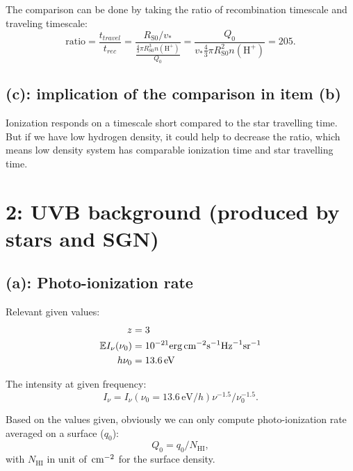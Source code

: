 \documentclass[12pt,letterpaper]{article}
\newcommand{\cm}{\textrm{\,cm}}
\newcommand{\sradius}{R_{\textrm{S0}}}
\newcommand{\hdensity}{n(\textrm{H}^{+})}
\newcommand{\second}{\textrm{s}}
\newcommand{\erg}{\textrm{erg}}
\newcommand{\sr}{\textrm{sr}}
\newcommand{\hz}{\textrm{Hz}}
\newcommand{\nhi}{N_{\textrm{HI}}}
\newcommand{\mean}{\mathbb{E}}
\begin{document}
The comparison can be done by taking the ratio of recombination timescale and traveling timescale:
\begin{equation}
    \textrm{ratio} 
    = \frac{t_{travel}}{t_{rec}} 
    = \frac{ 
        \sradius / v_{*}
     }{
        \frac{\frac{4}{3} \pi \sradius^3 \hdensity}{Q_0}
     }
    = \frac{
        Q_0
    }{
        v_{*} {\frac{4}{3} \pi \sradius^2 \hdensity}
    }
    = 205.
\end{equation}

\subsection*{(c): implication of the comparison in item (b)}

Ionization responds on a timescale short compared to the star travelling time.
But if we have low hydrogen density, it could help to decrease the ratio, which means low density system has comparable ionization time and star travelling time. 

\section*{2: UVB background (produced by stars and SGN)}

\subsection*{(a): Photo-ionization rate}

Relevant given values:
\begin{equation}
    \begin{split}
        z &= 3\\
        \mean I_\nu(\nu_0) &= 10^{-21} \erg \cm^{-2} \second^{-1} \hz^{-1} \sr^{-1} \\
        h \nu_0 &= 13.6 \, \textrm{eV}
    \end{split}
\end{equation}

The intensity at given frequency:
\begin{equation}
    I_\nu = I_\nu(\nu_0 = 13.6 \, \textrm{eV}/ h) \nu^{-1.5}/\nu_0^{-1.5}.
\end{equation}

Based on the values given, obviously we can only compute photo-ionization rate averaged on a surface ($q_0$):
\begin{equation*}
    Q_0 = q_0 / \nhi,
\end{equation*}
with $\nhi$ in unit of $\cm^{-2}$ for the surface density.
\end{document}
